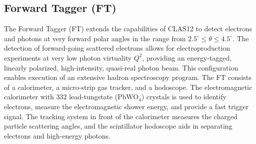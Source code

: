 \documentclass[final,3p]{elsarticle}
\begin{document}
\begin{twocolumn}
\subsection{Forward Tagger (FT)}

The Forward Tagger (FT) extends the capabilities of CLAS12 to detect electrons and photons at very forward
polar angles in the range from $2.5^\circ \le \theta \le 4.5^\circ$. The detection of forward-going scattered
electrons allows for electroproduction experiments at very low photon virtuality $Q^2$, providing an
energy-tagged, linearly polarized, high-intensity, quasi-real photon beam. This configuration enables execution of
an extensive hadron spectroscopy program. The FT consists of a calorimeter, a micro-strip gas tracker, and a
hodoscope. The electromagnetic calorimeter with 332 lead-tungstate (PbWO$_4$) crystals is used to identify
electrons,  measure the electromagnetic shower energy, and provide a fast trigger signal. The tracking system in
front of the calorimeter measures the charged particle scattering angles, and the scintillator hodoscope aids in
separating electrons and high-energy photons.


\end{twocolumn}
\end{document}
